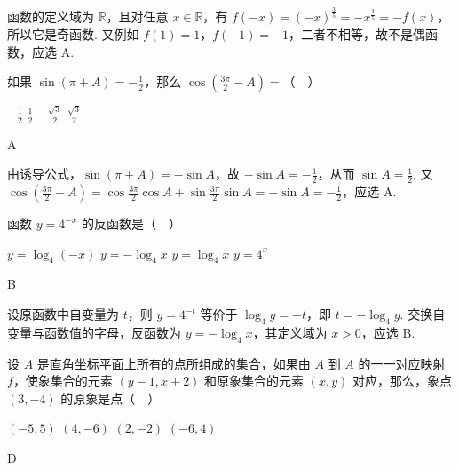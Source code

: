 \begin{solution}
函数的定义域为 \(\mathbb{R}\)，且对任意 \(x\in\mathbb{R}\)，有 \(f(-x)=(-x)^{\frac{3}{5}}=-x^{\frac{3}{5}}=-f(x)\)，所以它是奇函数. 又例如 \(f(1)=1\)，\(f(-1)=-1\)，二者不相等，故不是偶函数，应选 A.
\end{solution}

\begin{problem}
如果 \(\sin\left( \pi+A \right)=-\frac{1}{2}\)，那么 \(\cos\left( \frac{3\pi}{2}-A \right)=\)（\(\quad\)）

\choices
    {\(-\frac{1}{2}\)}
    {\(\frac{1}{2}\)}
    {\(-\frac{\sqrt{3}}{2}\)}
    {\(\frac{\sqrt{3}}{2}\)}
\end{problem}

\begin{answer}
A
\end{answer}

\begin{solution}
由诱导公式，\(\sin(\pi+A)=-\sin A\)，故 \(-\sin A=-\frac12\)，从而 \(\sin A=\frac12\). 又
\(\cos\left(\frac{3\pi}{2}-A\right)=\cos\frac{3\pi}{2}\cos A+\sin\frac{3\pi}{2}\sin A=-\sin A=-\frac12\)，应选 A.
\end{solution}

\begin{problem}
函数 \(y=4^{-x}\) 的反函数是（\(\quad\)）

\choices
    {\(y=\log_4\left( -x \right)\)}
    {\(y=-\log_4 x\)}
    {\(y=\log_4 x\)}
    {\(y=4^x\)}
\end{problem}

\begin{answer}
B
\end{answer}

\begin{solution}
设原函数中自变量为 \(t\)，则 \(y=4^{-t}\) 等价于 \(\log_4 y=-t\)，即 \(t=-\log_4 y\). 交换自变量与函数值的字母，反函数为 \(y=-\log_4 x\)，其定义域为 \(x>0\)，应选 B.
\end{solution}

\begin{problem}
设 \(A\) 是直角坐标平面上所有的点所组成的集合，如果由 \(A\) 到 \(A\) 的一一对应映射 \(f\)，使象集合的元素 \(\left( y-1,x+2 \right)\) 和原象集合的元素 \(\left( x,y \right)\) 对应，那么，象点 \((3,-4)\) 的原象是点（\(\quad\)）

\choices
    {\((-5,5)\)}
    {\((4,-6)\)}
    {\((2,-2)\)}
    {\((-6,4)\)}
\end{problem}

\begin{answer}
D
\end{answer}

